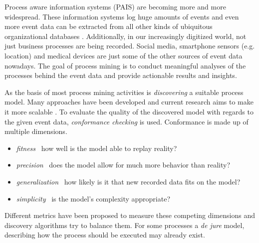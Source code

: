 Process aware information systems (PAIS) are becoming more and more widespread. These information systems log huge amounts of events and even more event data can be extracted from all other kinds of ubiquitous organizational databases \cite{van2015extracting}.
Additionally, in our increasingly digitized world, not just business processes are being recorded. Social media, smartphone sensors (e.g. location) and medical devices are just some of the other sources of event data nowadays.
The goal of process mining is to conduct meaningful analyses of the processes behind the event data and provide actionable results and insights.

As the basis of most process mining activities is \emph{discovering} a suitable process model. Many approaches have been developed \cite{van2016process} and current research aims to make it more scalable \cite{leemans2018scalable}.
To evaluate the quality of the discovered model with regards to the given event data, \emph{conformance checking} is used. Conformance is made up of multiple dimensions.
\begin{itemize}
    \item \emph{fitness} \textemdash \ how well is the model able to replay reality?
    \item \emph{precision} \textemdash \ does the model allow for much more behavior than reality?
    \item \emph{generalization} \textemdash \ how likely is it that new recorded data fits on the model?
    \item \emph{simplicity} \textemdash \ is the model's complexity appropriate?
\end{itemize}
Different metrics have been proposed to measure these competing dimensions \cite{van2016process} and discovery algorithms try to balance them.
For some processes a \emph{de jure} model, describing how the process should be executed may already exist.

